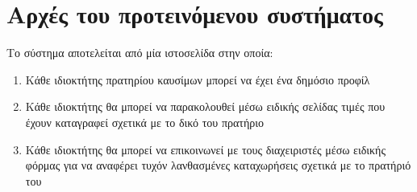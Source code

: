 \section{Αρχές του προτεινόμενου συστήματος}

Το σύστημα αποτελείται από μία ιστοσελίδα στην οποία:
\begin{enumerate}
	\item Κάθε ιδιοκτήτης πρατηρίου καυσίμων μπορεί να έχει ένα δημόσιο προφίλ
	\item Κάθε ιδιοκτήτης θα μπορεί να παρακολουθεί μέσω ειδικής σελίδας τιμές που έχουν καταγραφεί σχετικά με το δικό του πρατήριο
	\item Κάθε ιδιοκτήτης θα μπορεί να επικοινωνεί με τους διαχειριστές μέσω ειδικής φόρμας για να αναφέρει τυχόν λανθασμένες καταχωρήσεις σχετικά με το πρατήριό του
\end{enumerate}

